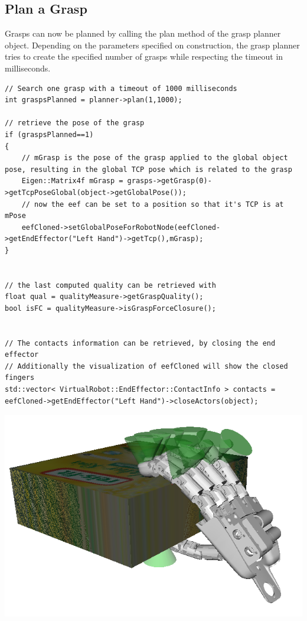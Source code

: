\subsection{Plan a Grasp}
Grasps can now be planned by calling the plan method of the grasp planner object. Depending on the parameters specified on construction, the grasp planner tries to create the specified number of grasps while respecting the timeout in milliseconds. 
\begin{lstlisting}
// Search one grasp with a timeout of 1000 milliseconds
int graspsPlanned = planner->plan(1,1000);

// retrieve the pose of the grasp
if (graspsPlanned==1)
{
    // mGrasp is the pose of the grasp applied to the global object pose, resulting in the global TCP pose which is related to the grasp
    Eigen::Matrix4f mGrasp = grasps->getGrasp(0)->getTcpPoseGlobal(object->getGlobalPose());
    // now the eef can be set to a position so that it's TCP is at mPose 
    eefCloned->setGlobalPoseForRobotNode(eefCloned->getEndEffector("Left Hand")->getTcp(),mGrasp);
}


// the last computed quality can be retrieved with
float qual = qualityMeasure->getGraspQuality();
bool isFC = qualityMeasure->isGraspForceClosure();


// The contacts information can be retrieved, by closing the end effector
// Additionally the visualization of eefCloned will show the closed fingers
std::vector< VirtualRobot::EndEffector::ContactInfo > contacts = eefCloned->getEndEffector("Left Hand")->closeActors(object);
\end{lstlisting}
\includegraphics[width=\textwidth]{GraspPlanner1}
